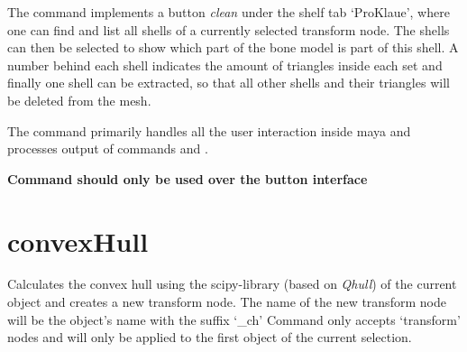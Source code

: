 \documentclass[letterpaper,10pt,english]{sphinxmanual}
\begin{document}
The command implements a button \emph{clean} under the shelf tab `ProKlaue', where one can find and list all shells of a currently selected transform node. The shells can then be selected to show which part of the bone model is part of this shell. A number behind each shell indicates the amount of triangles inside each set and finally one shell can be extracted, so that all other shells and their triangles will be deleted from the mesh.

The command primarily handles all the user interaction inside maya and processes output of commands {\hyperref[pk_src.getShells:getshells]{}} and {\hyperref[pk_src.findTubeFaces:findtubefaces]{}}.

\textbf{Command should only be used over the button interface}


\section{convexHull}
\label{pk_src.convexHull::doc}\label{pk_src.convexHull:convexhull}\label{pk_src.convexHull:id1}
{\hyperref[index:commands]{}}
\label{pk_src.convexHull:module-pk_src.convexHull}
Calculates the convex hull using the scipy-library (based on \emph{Qhull}) of the current object and creates a new transform node. The name of the new transform node will be the object's name with the suffix `\_ch'
Command only accepts `transform' nodes and will only be applied to the first object of the current selection.
\end{document}
